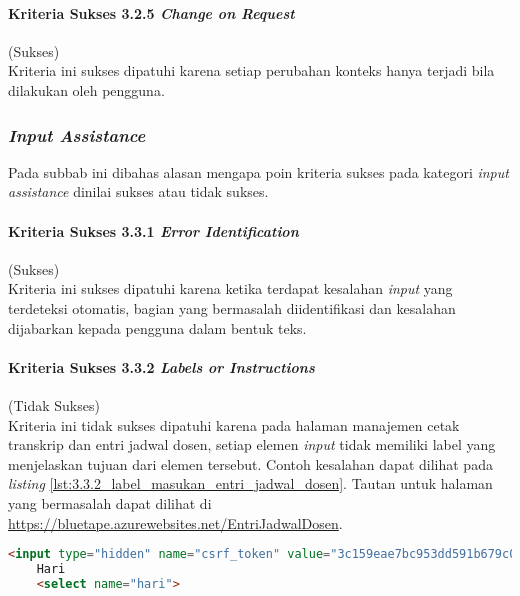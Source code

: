 \paragraph{Kriteria Sukses 3.2.5 \textit{Change on Request}}
\label{par:kepatuhan_bluetape_kriteria_sukses_3.2.5}
(Sukses)\\

Kriteria ini sukses dipatuhi karena setiap perubahan konteks hanya terjadi bila dilakukan oleh pengguna.

\subsubsection{\textit{Input Assistance}}
\label{subsubsec:kepatuhan_bluetape_input_assistance}
Pada subbab ini dibahas alasan mengapa poin kriteria sukses pada kategori \textit{input assistance} dinilai sukses atau tidak sukses.

\paragraph{Kriteria Sukses 3.3.1 \textit{Error Identification}}
\label{par:kepatuhan_bluetape_kriteria_sukses_3.3.1}
(Sukses)\\

Kriteria ini sukses dipatuhi karena ketika terdapat kesalahan \textit{input} yang terdeteksi otomatis, bagian yang bermasalah diidentifikasi dan kesalahan dijabarkan kepada pengguna dalam bentuk teks.

\paragraph{Kriteria Sukses 3.3.2 \textit{Labels or Instructions}}
\label{par:kepatuhan_bluetape_kriteria_sukses_3.3.2}
(Tidak Sukses)\\

Kriteria ini tidak sukses dipatuhi karena pada halaman manajemen cetak transkrip dan entri jadwal dosen, setiap elemen \textit{input} tidak memiliki label yang menjelaskan tujuan dari elemen tersebut. Contoh kesalahan dapat dilihat pada \textit{listing} \ref{lst:3.3.2_label_masukan_entri_jadwal_dosen}. Tautan untuk halaman yang bermasalah dapat dilihat di \url{https://bluetape.azurewebsites.net/EntriJadwalDosen}.

\begin{lstlisting}[frame=single, label={lst:3.3.2_label_masukan_entri_jadwal_dosen}, language=HTML, caption=Pelanggaran Kriteria Sukses 3.3.2 pada Halaman Entri Jadwal Dosen]
    <input type="hidden" name="csrf_token" value="3c159eae7bc953dd591b679c080ed066"/>
    Hari
    <select name="hari">
\end{lstlisting}

